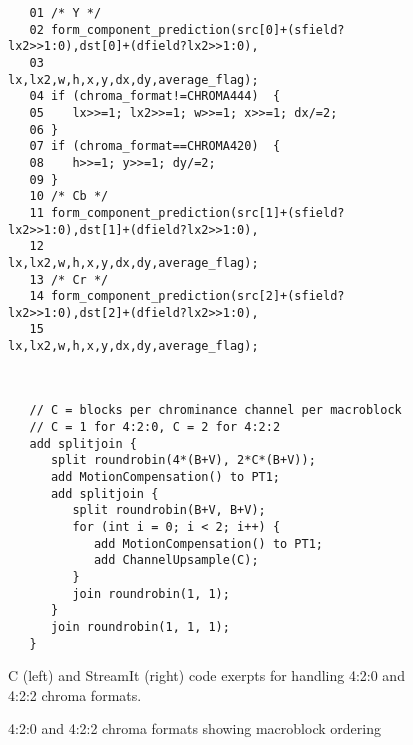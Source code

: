 \begin{figure*}[t]
 \begin{minipage}[t]{4.3in}{
  \begin{scriptsize}
   \begin{verbatim}
   01 /* Y */
   02 form_component_prediction(src[0]+(sfield?lx2>>1:0),dst[0]+(dfield?lx2>>1:0),
   03                           lx,lx2,w,h,x,y,dx,dy,average_flag);
   04 if (chroma_format!=CHROMA444)  {
   05    lx>>=1; lx2>>=1; w>>=1; x>>=1; dx/=2;
   06 }
   07 if (chroma_format==CHROMA420)  {
   08    h>>=1; y>>=1; dy/=2;
   09 }
   10 /* Cb */
   11 form_component_prediction(src[1]+(sfield?lx2>>1:0),dst[1]+(dfield?lx2>>1:0),
   12                           lx,lx2,w,h,x,y,dx,dy,average_flag);
   13 /* Cr */
   14 form_component_prediction(src[2]+(sfield?lx2>>1:0),dst[2]+(dfield?lx2>>1:0),
   15                           lx,lx2,w,h,x,y,dx,dy,average_flag);    
   \end{verbatim}
  \end{scriptsize}
 }
 \label{fig:chroma-stream}
\vspace{-12pt}
 \end{minipage}
 ~~\vrule~~
 \begin{minipage}[t]{4.3in}{
  \begin{scriptsize}
   \begin{verbatim}
   // C = blocks per chrominance channel per macroblock 
   // C = 1 for 4:2:0, C = 2 for 4:2:2
   add splitjoin {
      split roundrobin(4*(B+V), 2*C*(B+V));
      add MotionCompensation() to PT1;
      add splitjoin {
         split roundrobin(B+V, B+V);
         for (int i = 0; i < 2; i++) {
            add MotionCompensation() to PT1;
            add ChannelUpsample(C);
         }
         join roundrobin(1, 1);
      }
      join roundrobin(1, 1, 1);
   }
   \end{verbatim}
  \end{scriptsize}
 }
\vspace{-12pt}
 \end{minipage}
 \caption{C (left) and StreamIt (right) code exerpts for handling
          4:2:0 and 4:2:2 chroma formats.} %
 \label{fig:chroma-format-code}
\end{figure*}

\begin{figure}[t]
\begin{center}
   \caption{4:2:0 and 4:2:2 chroma formats showing macroblock ordering}
   \label{fig:chroma-block-layout}
\end{center}
\end{figure}